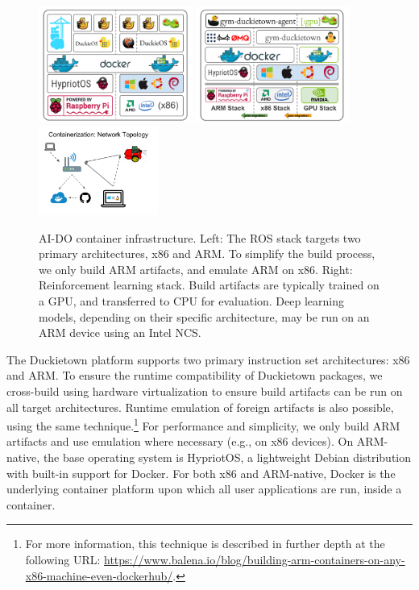 \documentclass[12pt,initial,twoside,maitrise]{dms}
\numberwithin{equation}{section}
\numberwithin{table}{chapter}
\numberwithin{figure}{chapter}
\begin{document}
    \begin{figure}[ht]
        \centering
        \includegraphics[width=0.45\textwidth]{docker_stack_1.png}
        \includegraphics[width=0.45\textwidth]{docker_stack_2.png}
        \includegraphics[width=0.35\textwidth]{network_infra.png}
        \caption{AI-DO container infrastructure. Left: The ROS stack targets two primary architectures, x86 and ARM. To simplify the build process, we only build ARM artifacts, and emulate ARM on x86. Right: Reinforcement learning stack. Build artifacts are typically trained on a GPU, and transferred to CPU for evaluation. Deep learning models, depending on their specific architecture, may be run on an ARM device using an Intel NCS.}
        \label{fig:docker}
    \end{figure}

    The Duckietown platform supports two primary instruction set architectures: x86 and ARM. To ensure the runtime compatibility of Duckietown packages, we cross-build using hardware virtualization to ensure build artifacts can be run on all target architectures. Runtime emulation of foreign artifacts is also possible, using the same technique.\footnote{For more information, this technique is described in further depth at the following URL: \url{https://www.balena.io/blog/building-arm-containers-on-any-x86-machine-even-dockerhub/}.} For performance and simplicity, we only build ARM artifacts and use emulation where necessary (e.g., on x86 devices). On ARM-native, the base operating system is HypriotOS, a lightweight Debian distribution with built-in support for Docker. For both x86 and ARM-native, Docker is the underlying container platform upon which all user applications are run, inside a container.
\end{document}
